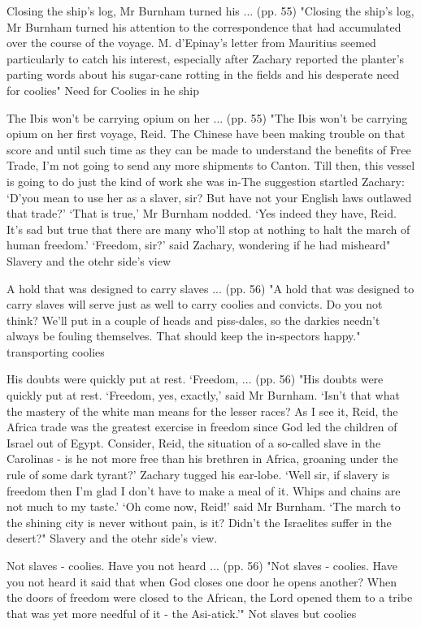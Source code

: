 Closing the ship’s log, Mr Burnham turned his ... (pp. 55)
"Closing the ship’s log, Mr Burnham turned his attention to the correspondence that had accumulated over the course of the voyage. M. d’Epinay’s letter from Mauritius seemed particularly to catch his interest, especially after Zachary reported the planter’s parting words about his sugar-cane rotting in the fields and his desperate need for coolies"
Need for Coolies in he ship

The Ibis won’t be carrying opium on her ... (pp. 55)
"The Ibis won’t be carrying opium on her first voyage, Reid. The Chinese have been making trouble on that score and until such time as they can be made to understand the benefits of Free Trade, I’m not going to send any more shipments to Canton. Till then, this vessel is going to do just the kind of work she was in-The suggestion startled Zachary: ‘D’you mean to use her as a slaver, sir? But have not your English laws outlawed that trade?’ ‘That is true,’ Mr Burnham nodded. ‘Yes indeed they have, Reid. It’s sad but true that there are many who’ll stop at nothing to halt the march of human freedom.’ ‘Freedom, sir?’ said Zachary, wondering if he had misheard"
Slavery and the otehr side's view

A hold that was designed to carry slaves ... (pp. 56)
"A hold that was designed to carry slaves will serve just as well to carry coolies and convicts. Do you not think? We’ll put in a couple of heads and piss-dales, so the darkies needn’t always be fouling themselves. That should keep the in-spectors happy."
transporting coolies

His doubts were quickly put at rest. ‘Freedom, ... (pp. 56)
"His doubts were quickly put at rest. ‘Freedom, yes, exactly,’ said Mr Burnham. ‘Isn’t that what the mastery of the white man means for the lesser races? As I see it, Reid, the Africa trade was the greatest exercise in freedom since God led the children of Israel out of Egypt. Consider, Reid, the situation of a so-called slave in the Carolinas - is he not more free than his brethren in Africa, groaning under the rule of some dark tyrant?’ Zachary tugged his ear-lobe. ‘Well sir, if slavery is freedom then I’m glad I don’t have to make a meal of it. Whips and chains are not much to my taste.’ ‘Oh come now, Reid!’ said Mr Burnham. ‘The march to the shining city is never without pain, is it? Didn’t the Israelites suffer in the desert?"
Slavery and the otehr side's view.

Not slaves - coolies. Have you not heard ... (pp. 56)
"Not slaves - coolies. Have you not heard it said that when God closes one door he opens another? When the doors of freedom were closed to the African, the Lord opened them to a tribe that was yet more needful of it - the Asi-atick.’"
Not slaves but coolies

